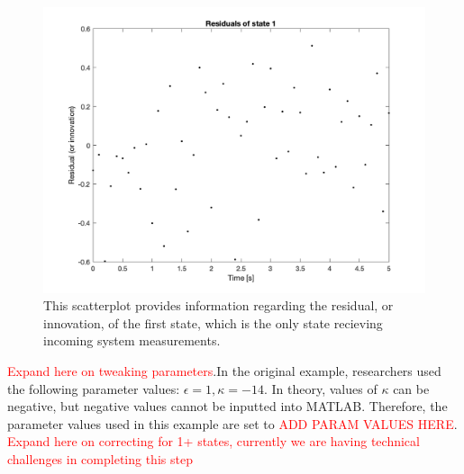 \begin{figure}[h]
    \centering
    \includegraphics[scale = 0.6]{Meskin_residuals_state1.png}
    \caption{This scatterplot provides information regarding the residual, or innovation, of the first state, which is the only state recieving incoming system measurements.}
\end{figure}


\noindent \textcolor{red}{Expand here on tweaking parameters}.In the original example, researchers used the following parameter values: $\epsilon = 1, \kappa = -14$. In theory, values of $\kappa$ can be negative, but negative values cannot be inputted into MATLAB. Therefore, the parameter values used in this example are set to \noindent \textcolor{red}{ADD PARAM VALUES HERE}.\\


\noindent \textcolor{red}{Expand here on correcting for 1+ states, currently we are having technical challenges in completing this step}













